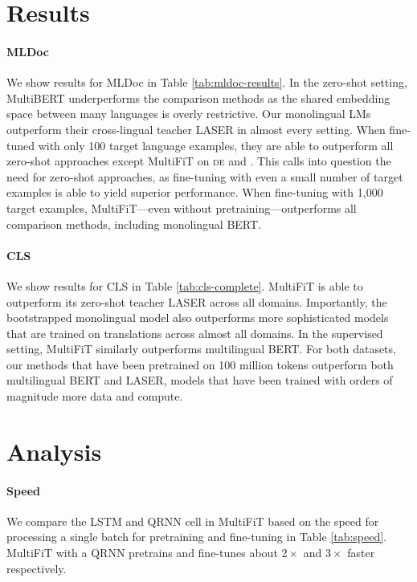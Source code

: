 \documentclass[11pt,a4paper]{article}
\newcommand{\de}{\textsc{de}\xspace}
\begin{document}
\section{Results} \label{sec:results}



\paragraph{MLDoc} We show results for MLDoc in Table \ref{tab:mldoc-results}. In the zero-shot setting, MultiBERT underperforms the comparison methods as the shared embedding space between many languages is overly restrictive. Our monolingual LMs outperform their cross-lingual teacher LASER in almost every setting. When fine-tuned with only 100 target language examples, they are able to outperform all zero-shot approaches except MultiFiT on \de{} and \fr. This calls into question the need for zero-shot approaches, as fine-tuning with even a small number of target examples is able to yield superior performance. When fine-tuning with 1,000 target examples, MultiFiT---even without pretraining---outperforms all comparison methods, including monolingual BERT.

\paragraph{CLS} We show results for CLS in Table \ref{tab:cls-complete}. MultiFiT is able to outperform its zero-shot teacher LASER across all domains. Importantly, the bootstrapped monolingual model also outperforms more sophisticated models that are trained on translations across almost all domains. In the supervised setting, MultiFiT similarly outperforms multilingual BERT. For both datasets, our methods that have been pretrained on 100 million tokens outperform both multilingual BERT and LASER, models that have been trained with orders of magnitude more data and compute.




\section{Analysis}

\paragraph{Speed} We compare the LSTM and QRNN cell in MultiFiT based on the speed for processing a single batch for pretraining and fine-tuning in Table \ref{tab:speed}. MultiFiT with a QRNN pretrains and fine-tunes about $2\times$ and $3\times$ faster respectively. 
\end{document}
